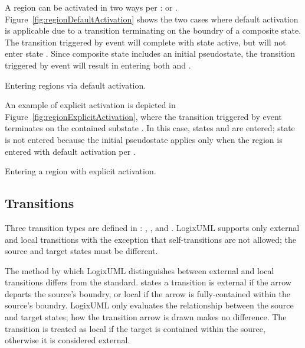 A region can be activated in two ways per \textcite[\S14.2.3.2]{OMGUML}:
 or
.
Figure~\ref{fig:regionDefaultActivation} shows the two cases where
default activation is applicable due to a transition terminating
on the boundry of a composite state. The transition triggered by
event  will complete with state 
active, but will not enter state .
Since composite state  includes an initial
pseudostate, the transition triggered by event  will
result in entering both  and .

               {Entering regions via default activation.}

An example of explicit activation is depicted in
Figure~\ref{fig:regionExplicitActivation}, where the transition triggered
by event  terminates on the contained substate
. In this case, states  and
 are entered;
state  is not entered because the initial pseudostate
applies only when the region is entered with default activation per
\textcite[\S14.2.3.7]{OMGUML}.

               {Entering a region with explicit activation.}


\subsection{Transitions}

Three transition types are defined in \textcite[\S14.2.3.8.1]{OMGUML}:
, ,
and . LogixUML supports only external and local
transitions with the exception that self-transitions are not allowed; the
source and target states must be different.

The method by which LogixUML distinguishes between external and local
transitions differs from the standard. \textcite[\S14.2.4.9]{OMGUML}
states a transition is external if the arrow departs the source's
boundry, or local if the arrow is fully-contained within the source's boundry.
LogixUML only evaluates the relationship between the source and target states;
how the transition arrow is drawn makes no difference. The transition is
treated as local if the target is contained within the source, otherwise
it is considered external.

